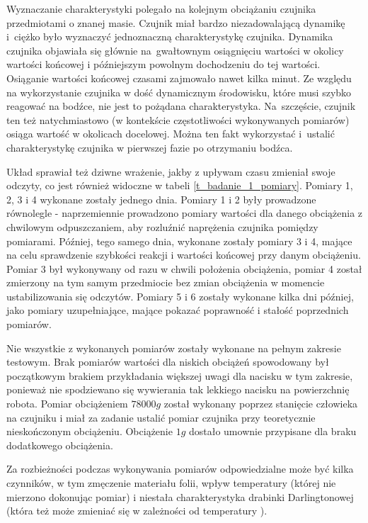 Wyznaczanie charakterystyki polegało na kolejnym obciążaniu czujnika przedmiotami o znanej masie. Czujnik miał bardzo niezadowalającą dynamikę i~ciężko było wyznaczyć jednoznaczną charakterystykę czujnika. Dynamika czujnika objawiała się głównie na~gwałtownym osiągnięciu wartości w okolicy wartości końcowej i późniejszym powolnym dochodzeniu do tej wartości. Osiąganie wartości końcowej czasami zajmowało nawet kilka minut. Ze względu na wykorzystanie czujnika w dość dynamicznym środowisku, które musi szybko reagować na bodźce, nie jest to pożądana charakterystyka. Na~szczęście, czujnik ten też natychmiastowo (w kontekście częstotliwości wykonywanych pomiarów) osiąga wartość w okolicach docelowej. Można ten fakt wykorzystać i~ustalić charakterystykę czujnika w pierwszej fazie po otrzymaniu bodźca.

Układ sprawiał też dziwne wrażenie, jakby z upływam czasu zmieniał swoje odczyty, co jest również widoczne w tabeli \ref{t_badanie_1_pomiary}. Pomiary 1, 2, 3 i 4 wykonane zostały jednego dnia. Pomiary 1 i 2 były prowadzone równolegle - naprzemiennie prowadzono pomiary wartości dla danego obciążenia z chwilowym odpuszczaniem, aby rozluźnić naprężenia czujnika pomiędzy pomiarami. Później, tego samego dnia, wykonane zostały pomiary 3 i 4, mające na celu sprawdzenie szybkości reakcji i wartości końcowej przy danym obciążeniu. Pomiar 3 był wykonywany od razu w chwili położenia obciążenia, pomiar 4 został zmierzony na tym samym przedmiocie bez zmian obciążenia w momencie ustabilizowania się odczytów. Pomiary 5 i 6 zostały wykonane kilka dni później, jako pomiary uzupełniające, mające pokazać poprawność i stałość poprzednich pomiarów. 

Nie wszystkie z wykonanych pomiarów zostały wykonane na pełnym zakresie testowym. Brak pomiarów wartości dla niskich obciążeń spowodowany był początkowym brakiem przykładania większej uwagi dla nacisku w tym zakresie, ponieważ nie spodziewano się wywierania tak lekkiego nacisku na powierzchnię robota. 
Pomiar obciążeniem $78000 g$ został wykonany poprzez stanięcie człowieka na czujniku i miał za zadanie ustalić pomiar czujnika przy teoretycznie nieskończonym obciążeniu. Obciążenie $1 g$ dostało umownie przypisane dla braku dodatkowego obciążenia.

Za rozbieżności podczas wykonywania pomiarów odpowiedzialne może być kilka czynników, w tym zmęczenie materiału folii, wpływ temperatury (której nie mierzono dokonując pomiar) i niestała charakterystyka drabinki Darlingtonowej (która też może zmieniać się w zależności od temperatury \cite{b_site_ULN2803}).

